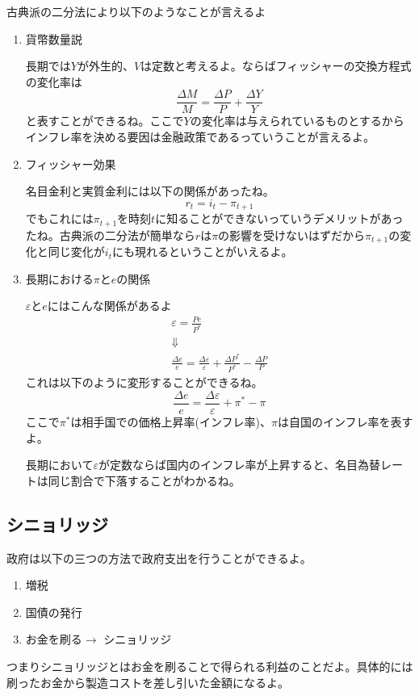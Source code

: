 \documentclass[a4paper, 12pt]{article}
\begin{document}
古典派の二分法により以下のようなことが言えるよ
\begin{enumerate}
  \item 貨幣数量説

  長期では$Y$が外生的、$V$は定数と考えるよ。ならばフィッシャーの交換方程式の変化率は
  \begin{equation*}
    \frac{\Delta M}{M}=\frac{\Delta P}{P}+\frac{\Delta Y}{Y}
  \end{equation*}
  と表すことができるね。ここで$Y$の変化率は与えられているものとするからインフレ率を決める要因は金融政策であるっていうことが言えるよ。

  \item フィッシャー効果

  名目金利と実質金利には以下の関係があったね。
  \begin{equation*}
    r_t=i_t-\pi_{t+1}
  \end{equation*}
  でもこれには$\pi_{t+1}$を時刻$t$に知ることができないっていうデメリットがあったね。古典派の二分法が簡単なら$r$は$\pi$の影響を受けないはずだから$\pi_{t+1}$の変化と同じ変化が$i_t$にも現れるということがいえるよ。

  \item 長期における$\pi$と$e$の関係

  $\varepsilon$と$e$にはこんな関係があるよ
  \begin{displaymath}
    \begin{array}{c}
      \displaystyle \varepsilon = \frac{Pe}{P^*}\\
      \Downarrow \\
      \displaystyle \frac{\Delta e}{e} =\frac{\Delta \varepsilon}{\varepsilon}+\frac{\Delta P^*}{P^*}-\frac{\Delta P}{P}
    \end{array}
  \end{displaymath}
  これは以下のように変形することができるね。
  \begin{equation*}
    \frac{\Delta e}{e} =\frac{\Delta \varepsilon}{\varepsilon}+\pi^*-\pi
  \end{equation*}
  ここで$\pi^*$は相手国での価格上昇率(インフレ率)、$\pi$は自国のインフレ率を表すよ。

  長期において$\varepsilon$が定数ならば国内のインフレ率が上昇すると、名目為替レートは同じ割合で下落することがわかるね。
\end{enumerate}
\subsection{シニョリッジ}
政府は以下の三つの方法で政府支出を行うことができるよ。
\begin{enumerate}
  \item 増税
  \item 国債の発行
  \item お金を刷る$\rightarrow$ シニョリッジ
\end{enumerate}
つまりシニョリッジとはお金を刷ることで得られる利益のことだよ。具体的には刷ったお金から製造コストを差し引いた金額になるよ。
\end{document}
